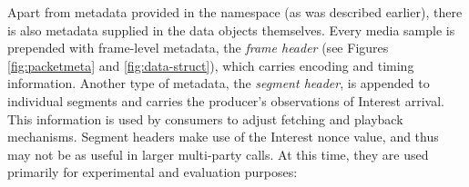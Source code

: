\documentclass{icn/sig-alternate-2013} %
\newcommand{\ndnrtcName}{NDN-RTC} %
\begin{document}
Apart from metadata provided in the namespace (as was described earlier), there is also metadata supplied in the data objects themselves.
%
Every media sample is prepended with frame-level metadata, the \textit{frame header} (see Figures \ref{fig:packetmeta} and \ref{fig:data-struct}), which carries encoding and timing information. %
Another type of metadata, the \textit{segment header}, is appended to individual segments and carries the producer's observations of Interest arrival. This information is used by consumers to adjust fetching and playback mechanisms.  
Segment headers make use of the Interest nonce value, and thus may not be as useful in larger multi-party calls. At this time, they are used primarily for experimental and evaluation purposes:
\end{document}
